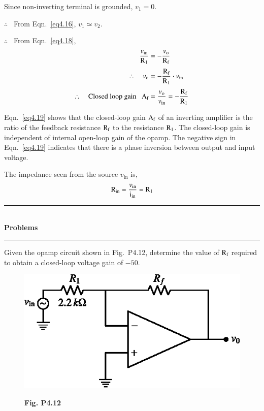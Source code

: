 Since non-inverting terminal is grounded, $v_{1}=0$.

$\therefore$~ From Eqn.~\eqref{eq4.16}, $v_{1}\simeq v_{2}$.

$\therefore$~ From Eqn.~\eqref{eq4.18},
\begin{align}
\frac{v_{\text{in}}}{\textrm{R}_{1}} &= -\frac{v_{\textrm{o}}}{\textrm{R}_{\textrm{f}}}\notag\\[3pt]
\therefore\quad v_{\textrm{o}} &= -\frac{\textrm{R}_{\textrm{f}}}{\textrm{R}_{1}}\cdot v_{\text{in}}\notag\\[3pt]
\therefore\quad \text{Closed loop gain~~ } \textrm{A}_{\textrm{f}} &= \frac{v_{\textrm{o}}}{v_{\text{in}}}=-\frac{\textrm{R}_{\textrm{f}}}{\textrm{R}_{1}}\label{eq4.19}
\end{align}

Eqn.~\eqref{eq4.19} shows that the closed-loop gain $\textrm{A}_{\textrm{f}}$ of an inverting amplifier is the ratio of the feedback resistance $\textrm{R}_{\textrm{f}}$ to the resistance $\textrm{R}_{1}$. The closed-loop gain is independent of internal open-loop gain of the opamp. The negative sign in Eqn.~\eqref{eq4.19} indicates that there is a phase inversion between output and input voltage.

The impedance seen from the source $v_{\text{in}}$ is,
\begin{equation}
\textrm{R}_{\text{in}}=\frac{v_{\text{in}}}{\textrm{i}_{\text{in}}}=\textrm{R}_{1}\label{eq4.20}
\end{equation}

\begin{center}
\rule{4cm}{1pt}\\
{\bf\Large Problems}\\[-3pt]
\rule{4cm}{1pt}
\end{center}

\begin{problem}\label{prob4.12}
Given the opamp circuit shown in Fig.~P4.12, determine the value of $\textrm{R}_{\textrm{f}}$ required to obtain a closed-loop voltage gain of $-50$.
\begin{figure}[H]
\centering
\includegraphics{chap4/figP4.12.eps}

\smallskip
{\bf Fig. P4.12}
\end{figure}
\end{problem}

